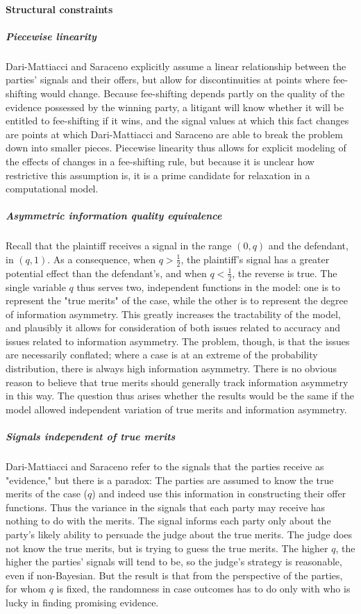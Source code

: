 \documentclass{article}
\begin{document}
\paragraph{Structural constraints}
\subparagraph{Piecewise linearity} Dari-Mattiacci and Saraceno explicitly assume a linear relationship between the parties' signals and their offers, but allow for discontinuities at points where fee-shifting would change. Because fee-shifting depends partly on the quality of the evidence possessed by the winning party, a litigant will know whether it will be entitled to fee-shifting if it wins, and the signal values at which this fact changes are points at which Dari-Mattiacci and Saraceno are able to break the problem down into smaller pieces. Piecewise linearity thus allows for explicit modeling of the effects of changes in a fee-shifting rule, but because it is unclear how restrictive this assumption is, it is a prime candidate for relaxation in a computational model.

\subparagraph{Asymmetric information quality equivalence} Recall that the plaintiff receives a signal in the range $(0,q)$ and the defendant, in $(q,1)$. As a consequence, when $q > \frac{1}{2}$, the plaintiff's signal has a greater potential effect than the defendant's, and when $q < \frac{1}{2}$, the reverse is true. The single variable $q$ thus serves two, independent functions in the model: one is to represent the "true merits" of the case, while the other is to represent the degree of information asymmetry. This greatly increases the tractability of the model, and plausibly it allows for consideration of both issues related to accuracy and issues related to information asymmetry. The problem, though, is that the issues are necessarily conflated; where a case is at an extreme of the probability distribution, there is always high information asymmetry. There is no obvious reason to believe that true merits should generally track information asymmetry in this way. The question thus arises whether the results would be the same if the model allowed independent variation of true merits and information asymmetry. 

\subparagraph{Signals independent of true merits}Dari-Mattiacci and Saraceno refer to the signals that the parties receive as "evidence," but there is a paradox: The parties are assumed to know the true merits of the case ($q$) and indeed use this information in constructing their offer functions. Thus the variance in the signals that each party may receive has nothing to do with the merits. The signal informs each party only about the party's likely ability to persuade the judge about the true merits. The judge does not know the true merits, but is trying to guess the true merits. The higher $q$, the higher the parties' signals will tend to be, so the judge's strategy is reasonable, even if non-Bayesian. But the result is that from the perspective of the parties, for whom $q$ is fixed, the randomness in case outcomes has to do only with who is lucky in finding promising evidence.
\end{document}
